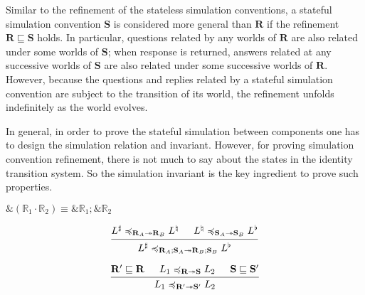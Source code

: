 \documentclass[acmsmall,screen,review,anonymous]{acmart}
\renewcommand{\preceq}{\preccurlyeq}
\begin{document}
Similar to the refinement of the stateless simulation conventions,
a stateful simulation convention $\mathbf{S}$
is considered more general than $\mathbf{R}$
if the refinement $\mathbf{R} \sqsubseteq \mathbf{S}$ holds.
In particular, questions related by any worlds of $\mathbf{R}$
are also related under some worlds of $\mathbf{S}$;
when response is returned,
answers related at any successive worlds of $\mathbf{S}$
are also related under some successive worlds of $\mathbf{R}$.
However, because the questions and replies related
by a stateful simulation convention
are subject to the transition of its world,
the refinement unfolds indefinitely as the world evolves.

In general, in order to prove the stateful simulation between components
one has to design the simulation relation and invariant.
However, for proving simulation convention refinement,
there is not much to say about the states in the identity transition system.
So the simulation invariant is the key ingredient to prove such properties.

\begin{lemma}
$ \&(\mathbb{R}_1 \cdot \mathbb{R}_2) \equiv
   \&\mathbb{R}_1 \mathop; \&\mathbb{R}_2 $
\end{lemma}

\begin{theorem} %
\[
  \begin{prooftree}
    \hypo{L^\sharp
      \preceq_{\mathbf{R}_A \twoheadrightarrow \mathbf{R}_B}
      L^\natural}
    \hypo{L^\natural
      \preceq_{\mathbf{S}_A \twoheadrightarrow \mathbf{S}_B}
      L^\flat}
    \infer2{L^\sharp
      \preceq_{\mathbf{R}_A \mathbin; \mathbf{S}_A \twoheadrightarrow
	   \mathbf{R}_B \mathbin; \mathbf{S}_B}
      L^\flat}
  \end{prooftree}
\]
\end{theorem}

\begin{theorem} \label{thm:scseq}
  \[
    \begin{prooftree}
      \hypo{\mathbf{R'} \sqsubseteq \mathbf{R}}
      \hypo{L_1 \preceq_{\mathbf{R} \twoheadrightarrow \mathbf{S}} L_2}
      \hypo{\mathbf{S} \sqsubseteq \mathbf{S'}}
      \infer3{L_1 \preceq_{\mathbf{R'} \twoheadrightarrow \mathbf{S'}} L_2}
    \end{prooftree}
  \]
\end{theorem}
\end{document}
